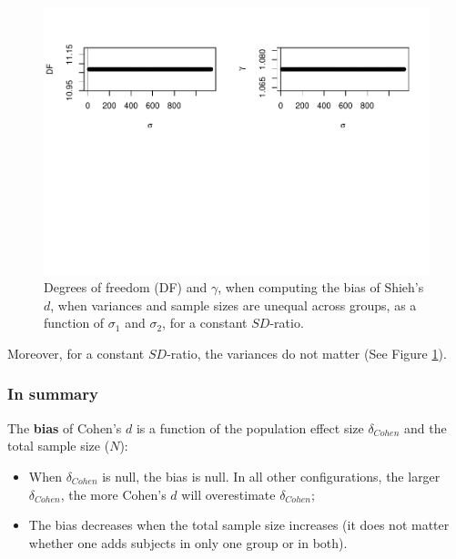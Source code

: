 \documentclass[
  english,
  man,mask]{apa6}
\providecommand{\tightlist}{%
  \setlength{\itemsep}{0pt}\setlength{\parskip}{0pt}}
\begin{document}
\begin{figure}
\centering
\includegraphics{Theoretical-Bias-of-all-estimators-as-a-function-of-population-parameters_files/figure-latex/biasshiehhetunbalvariance2-1.pdf}
\caption{\label{fig:biasshiehhetunbalvariance2}Degrees of freedom (DF) and \(\gamma\), when computing the bias of Shieh's \(d\), when variances and sample sizes are unequal across groups, as a function of \(\sigma_1\) and \(\sigma_2\), for a constant \(SD\)-ratio.}
\end{figure}

Moreover, for a constant \(SD\)-ratio, the variances do not matter (See Figure \ref{fig:biasshiehhetunbalvariance2}).

\hypertarget{in-summary}{%
\subsubsection{In summary}\label{in-summary}}

The \textbf{bias} of Cohen's \(d\) is a function of the population effect size \(\delta_{Cohen}\) and the total sample size (\(N\)):

\begin{itemize}
\tightlist
\item
  When \(\delta_{Cohen}\) is null, the bias is null. In all other configurations, the larger \(\delta_{Cohen}\), the more Cohen's \(d\) will overestimate \(\delta_{Cohen}\);\\
\item
  The bias decreases when the total sample size increases (it does not matter whether one adds subjects in only one group or in both).
\end{itemize}
\end{document}
